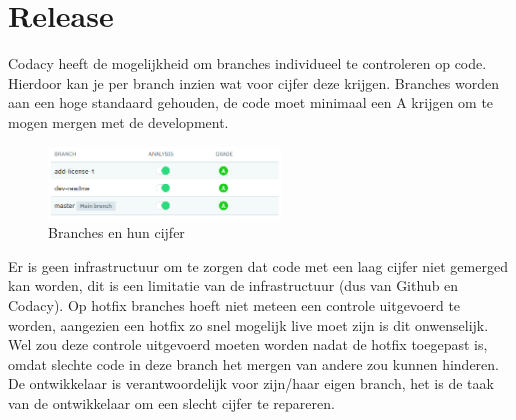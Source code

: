\section{Release}
Codacy heeft de mogelijkheid om branches individueel te controleren op code.
Hierdoor kan je per branch inzien wat voor cijfer deze krijgen.
Branches worden aan een hoge standaard gehouden, de code moet minimaal een A krijgen om te mogen mergen met de development.
\begin{figure}[H]
	\centering\includegraphics[width=0.55\textwidth]{images/CodacyBranchGrades}
	\caption{Branches en hun cijfer}
\end{figure}
Er is geen infrastructuur om te zorgen dat code met een laag cijfer niet gemerged kan worden, dit is een limitatie van de infrastructuur (dus van Github en Codacy).
Op hotfix branches hoeft niet meteen een controle uitgevoerd te worden, aangezien een hotfix zo snel mogelijk live moet zijn is dit onwenselijk.
Wel zou deze controle uitgevoerd moeten worden nadat de hotfix toegepast is, omdat slechte code in deze branch het mergen van andere zou kunnen hinderen.
De ontwikkelaar is verantwoordelijk voor zijn/haar eigen branch, het is de taak van de ontwikkelaar om een slecht cijfer te repareren.
